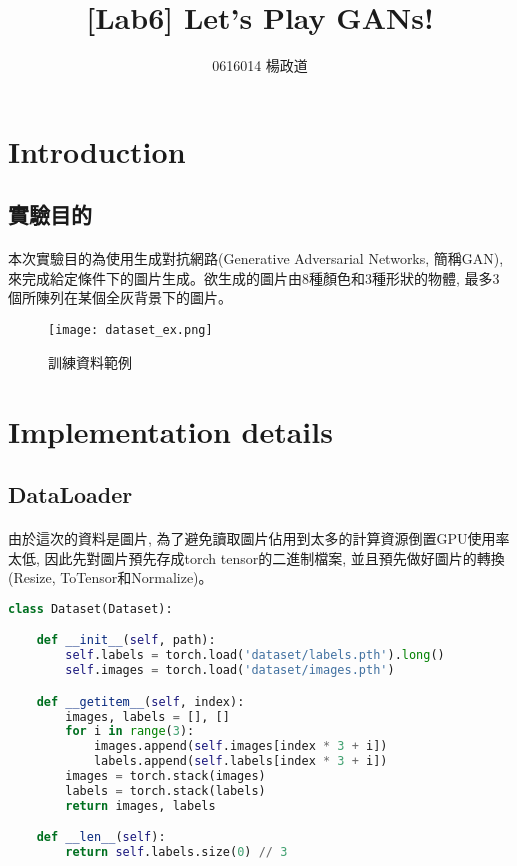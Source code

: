 \title{[Lab6] Let's Play GANs!}
\author{0616014 楊政道}
\maketitle
\thispagestyle{fancy}
\section{Introduction}
\subsection{實驗目的}
\paragraph{}
本次實驗目的為使用生成對抗網路(Generative Adversarial Networks, 簡稱GAN), 來完成給定條件下的圖片生成。欲生成的圖片由8種顏色和3種形狀的物體, 最多3個所陳列在某個全灰背景下的圖片。
\begin{figure}[!ht]
    \begin{center} 
        \texttt{[image: dataset\_ex.png]}
        \caption{訓練資料範例}
    \end{center} 
\end{figure}
\section{Implementation details}
\subsection{DataLoader}
\paragraph{}
由於這次的資料是圖片, 為了避免讀取圖片佔用到太多的計算資源倒置GPU使用率太低, 因此先對圖片預先存成torch tensor的二進制檔案, 並且預先做好圖片的轉換(Resize, ToTensor和Normalize)。
\begin{lstlisting}[language=Python]
class Dataset(Dataset):

    def __init__(self, path):
        self.labels = torch.load('dataset/labels.pth').long()
        self.images = torch.load('dataset/images.pth')

    def __getitem__(self, index):
        images, labels = [], []
        for i in range(3):
            images.append(self.images[index * 3 + i])
            labels.append(self.labels[index * 3 + i])
        images = torch.stack(images)
        labels = torch.stack(labels)
        return images, labels

    def __len__(self):
        return self.labels.size(0) // 3
\end{lstlisting}
